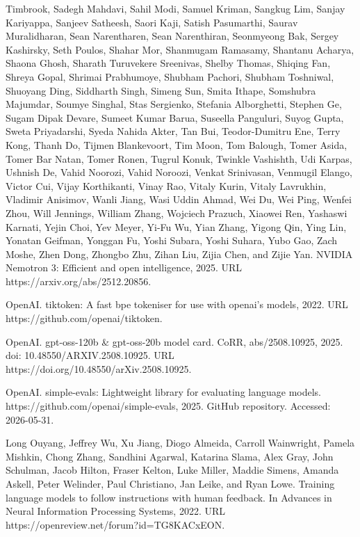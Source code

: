 Timbrook, Sadegh Mahdavi, Sahil Modi, Samuel Kriman, Sangkug Lim, Sanjay
Kariyappa, Sanjeev Satheesh, Saori Kaji, Satish Pasumarthi, Saurav
Muralidharan, Sean Narentharen, Sean Narenthiran, Seonmyeong Bak, Sergey
Kashirsky, Seth Poulos, Shahar Mor, Shanmugam Ramasamy, Shantanu
Acharya, Shaona Ghosh, Sharath Turuvekere Sreenivas, Shelby Thomas,
Shiqing Fan, Shreya Gopal, Shrimai Prabhumoye, Shubham Pachori, Shubham
Toshniwal, Shuoyang Ding, Siddharth Singh, Simeng Sun, Smita Ithape,
Somshubra Majumdar, Soumye Singhal, Stas Sergienko, Stefania
Alborghetti, Stephen Ge, Sugam Dipak Devare, Sumeet Kumar Barua,
Suseella Panguluri, Suyog Gupta, Sweta Priyadarshi, Syeda Nahida Akter,
Tan Bui, Teodor-Dumitru Ene, Terry Kong, Thanh Do, Tijmen Blankevoort,
Tim Moon, Tom Balough, Tomer Asida, Tomer Bar Natan, Tomer Ronen, Tugrul
Konuk, Twinkle Vashishth, Udi Karpas, Ushnish De, Vahid Noorozi, Vahid
Noroozi, Venkat Srinivasan, Venmugil Elango, Victor Cui, Vijay
Korthikanti, Vinay Rao, Vitaly Kurin, Vitaly Lavrukhin, Vladimir
Anisimov, Wanli Jiang, Wasi Uddin Ahmad, Wei Du, Wei Ping, Wenfei Zhou,
Will Jennings, William Zhang, Wojciech Prazuch, Xiaowei Ren, Yashaswi
Karnati, Yejin Choi, Yev Meyer, Yi-Fu Wu, Yian Zhang, Yigong Qin, Ying
Lin, Yonatan Geifman, Yonggan Fu, Yoshi Subara, Yoshi Suhara, Yubo Gao,
Zach Moshe, Zhen Dong, Zhongbo Zhu, Zihan Liu, Zijia Chen, and Zijie
Yan. NVIDIA Nemotron 3: Efficient and open intelligence, 2025. URL
https://arxiv.org/abs/2512.20856.

OpenAI. tiktoken: A fast bpe tokeniser for use with openai's models,
2022. URL https://github.com/openai/tiktoken.

OpenAI. gpt-oss-120b \& gpt-oss-20b model card. CoRR, abs/2508.10925,
2025. doi: 10.48550/ARXIV.2508.10925. URL
https://doi.org/10.48550/arXiv.2508.10925.



OpenAI. simple-evals: Lightweight library for evaluating language
models. https://github.com/openai/simple-evals, 2025. GitHub
repository. Accessed: 2026-05-31.

Long Ouyang, Jeffrey Wu, Xu Jiang, Diogo Almeida, Carroll Wainwright,
Pamela Mishkin, Chong Zhang, Sandhini Agarwal, Katarina Slama, Alex
Gray, John Schulman, Jacob Hilton, Fraser Kelton, Luke Miller, Maddie
Simens, Amanda Askell, Peter Welinder, Paul Christiano, Jan Leike, and
Ryan Lowe. Training language models to follow instructions with human
feedback. In Advances in Neural Information Processing Systems, 2022.
URL https://openreview.net/forum?id=TG8KACxEON.

